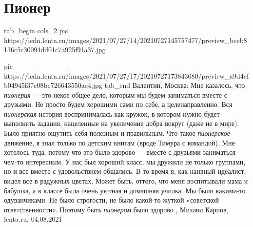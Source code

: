  
 
 
 
 
\chapter{Пионер}
\label{sec:slova.pioner}

\ifcmt
tab_begin cols=2
  pic https://icdn.lenta.ru/images/2021/07/27/14/20210727145757477/preview_beeb8136c5c30094dd01c7a925f91a37.jpg

	pic https://icdn.lenta.ru/images/2021/07/27/17/20210727173843680/preview_a9d4efb04945f37c08bc726643550ae4.jpg
tab_end
\fi
Валентин, Москва: Мне казалось, что \emph{пионерия} — это некое общее дело, которым мы
будем заниматься вместе с друзьями. Не просто будем хорошими сами по себе, а
целенаправленно.  Вся \emph{пионерская} история воспринималась как кружок, в котором
нужно будет выполнять задания, нацеленные на увеличение добра вокруг (даже не в
мире). Было приятно ощутить себя полезным и правильным.  Что такое \emph{пионерское}
движение, я знал только по детским книгам (вроде Тимура с командой). Мне
хотелось туда, потому что это было здорово — вместе с друзьями заниматься
чем-то интересным. У нас был хороший класс, мы дружили не только группами, но и
все вместе с удовольствием общались.  В то время я, как наивный идеалист, видел
все в радужных цветах. Может быть, оттого, что меня воспитывали мама и бабушка,
а в классе была очень уютная и домашняя училка. Мы были какими-то одуванчиками.
Не было строгости, не было какой-то жуткой «советской ответственности». Поэтому
быть \emph{пионером} было здорово
, 
Михаил Карпов, lenta.ru, 04.08.2021
